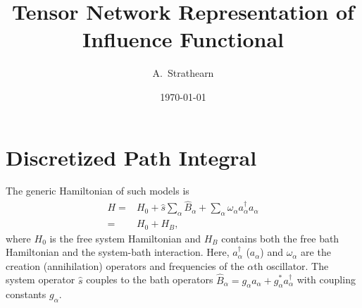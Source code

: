 \documentclass[a4paper, aps, pra,twocolumn]{revtex4-1}
\begin{document}
\title{Tensor Network Representation of Influence Functional}

\author{A.~Strathearn}

\date{\today}

\begin{abstract}


\end{abstract}

\maketitle



\section{Discretized Path Integral}
\label{sec:scheme}

The generic Hamiltonian of such models is
\begin{align}
\label{eq:hamil}
 H=&H_0+ \hat{s}\sum_\alpha \hat{B}_\alpha + \sum_\alpha \omega_\alpha a^\dagger_\alpha a_\alpha \\
=&H_0+H_B,
 \end{align}
where $H_0$ is the free system Hamiltonian and $H_B$ contains both the free bath Hamiltonian and the system-bath interaction. Here,  $a_\alpha^\dagger$ ($a_\alpha$) and $\omega_\alpha$ are the creation (annihilation) operators and frequencies of the $\alpha$th oscillator. The system operator $\hat{s}$ couples to the bath operators $\hat{B}_\alpha=g_\alpha a_\alpha+g_\alpha^* a_\alpha^\dagger$ with coupling constants $g_\alpha$.
\end{document}
